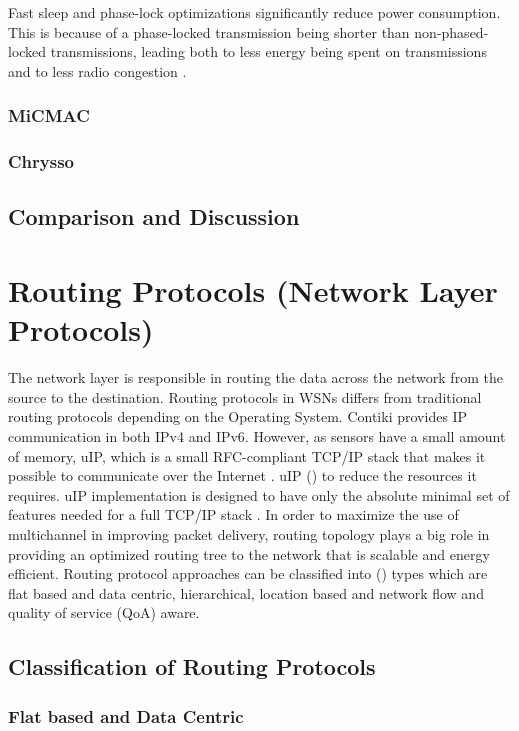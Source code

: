 Fast sleep and phase-lock optimizations significantly reduce power consumption. This is because of a phase-locked transmission being shorter than non-phased-locked transmissions, leading both to less energy being spent on transmissions and to less radio congestion \cite{contikimac}.

\subsubsection{MiCMAC}

\subsubsection{Chrysso}

\subsection{Comparison and Discussion}

\section{Routing Protocols (Network Layer Protocols)}
The network layer is responsible in routing the data across the network from the source to the destination. Routing protocols in WSNs differs from traditional routing protocols depending on the Operating System.
Contiki provides IP communication in both IPv4 and IPv6. However, as sensors have a small amount of memory, uIP, which is a small RFC-compliant TCP/IP stack that makes it possible to communicate over the Internet \cite{contikiDoc, contikiUIP}. uIP () to reduce the resources it requires.
uIP implementation is designed to have only the absolute minimal set of features needed for a full TCP/IP stack \cite{contikiDoc, contikiUIP}.
In order to maximize the use of multichannel in improving packet delivery, routing topology plays a big role in providing an optimized routing tree to the network that is scalable and energy efficient. 
Routing protocol approaches can be classified into () types which are flat based and data centric, hierarchical, location based and network flow and quality of service (QoA) aware.

\subsection{Classification of Routing Protocols}

\subsubsection{Flat based and Data Centric}

